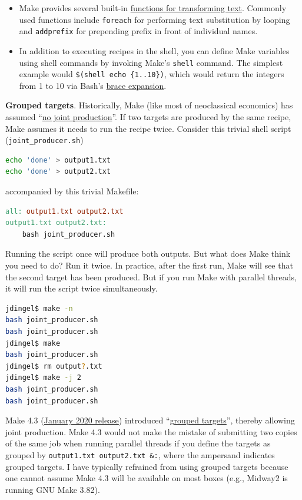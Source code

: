 \begin{itemize}
\item Make provides several built-in \href{https://www.gnu.org/software/make/manual/html_node/Functions.html\#Functions}{functions for transforming text}.
Commonly used functions include \texttt{foreach} for performing text substitution by looping
and \texttt{addprefix} for prepending prefix in front of individual names.
\item In addition to executing recipes in the shell, you can define Make variables using shell commands by invoking Make's \texttt{shell} command.
The simplest example would \texttt{\$(shell echo \{1..10\})}, which would return the integers from 1 to 10 via Bash's \href{https://www.shell-tips.com/bash/seq-brace-expansion/}{brace expansion}.
\end{itemize}

\textbf{Grouped targets}.
Historically, Make (like most of neoclassical economics) has assumed 
``\href{https://doi.org/10.2307/2525367}{no joint production}''.
If two targets are produced by the same recipe, Make assumes it needs to run the recipe twice.
Consider this trivial shell script (\texttt{joint\_producer.sh})
\begin{lstlisting}[language=bash]
echo 'done' > output1.txt
echo 'done' > output2.txt
\end{lstlisting}
accompanied by this trivial Makefile:
\begin{lstlisting}[language=make]
all: output1.txt output2.txt
output1.txt output2.txt:
	bash joint_producer.sh
\end{lstlisting}
Running the script once will produce both outputs.
But what does Make think you need to do? Run it twice.
In practice, after the first run, Make will see that the second target has been produced.
But if you run Make with parallel threads, it will run the script twice simultaneously.
\begin{lstlisting}[language=bash]
jdingel$ make -n
bash joint_producer.sh
bash joint_producer.sh
jdingel$ make
bash joint_producer.sh
jdingel$ rm output?.txt
jdingel$ make -j 2
bash joint_producer.sh
bash joint_producer.sh
\end{lstlisting}
Make 4.3 (\href{https://lwn.net/Articles/810071/}{January 2020 release}) introduced
``\href{https://www.gnu.org/software/make/manual/html_node/Multiple-Targets.html}{grouped targets}'',
thereby allowing joint production.
Make 4.3 would not make the mistake of submitting two copies of the same job when running parallel threads if you define the targets as grouped by \texttt{output1.txt output2.txt \&:},
where the ampersand indicates grouped targets.
I have typically refrained from using grouped targets because one cannot assume Make 4.3 will be available on most boxes (e.g., Midway2 is running GNU Make 3.82).

